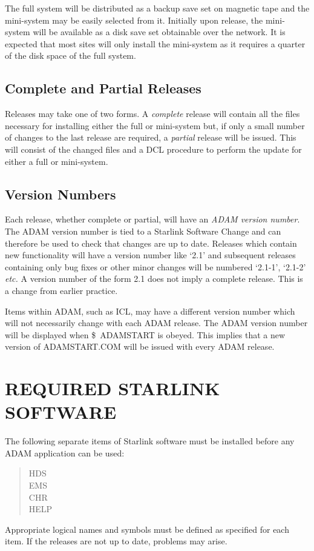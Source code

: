 The full system will be distributed as a backup save set on magnetic tape and
the mini-system may be easily selected from it. 
Initially upon release, the mini-system will be available as a disk save set 
obtainable over the network.
It is expected that most sites will only install the mini-system as it requires
a quarter of the disk space of the full system.

\subsection{Complete and Partial Releases}
Releases may take one of two forms.
A {\em complete} release will contain all the files necessary for installing
either the full or mini-system but, if only a small number of changes to the
last release are required, a {\em partial} release will be issued.
This will consist of the changed files and a DCL procedure to perform the
update for either a full or mini-system.

\subsection{Version Numbers}
\label{vers}
Each release, whether complete or partial, will have an {\em ADAM version
number}.
The ADAM version number is tied to a Starlink Software Change and can therefore
be used to check that changes are up to date.
Releases which contain new functionality will have a version number like `2.1' 
and subsequent releases containing only bug fixes or other minor changes will 
be numbered `2.1-1', `2.1-2' {\em etc.}
A version number of the form 2.1 does not imply a complete release. This is a
change from earlier practice.

Items within ADAM, such as ICL, may have a different version number which will
not necessarily change with each ADAM release.
The ADAM version number will be displayed when \mbox{\$ ADAMSTART} is obeyed.
This implies that a new version of ADAMSTART.COM will be issued with every ADAM
release.

\section{REQUIRED STARLINK SOFTWARE}
\label{reqs}
The following separate items of Starlink software must be installed before any
ADAM application can be used:
\small \begin{quote}
HDS \\
EMS \\
CHR \\
HELP

\end{quote} \normalsize
Appropriate logical names and symbols must be defined as specified for each
item.
If the releases are not up to date, problems may arise.


